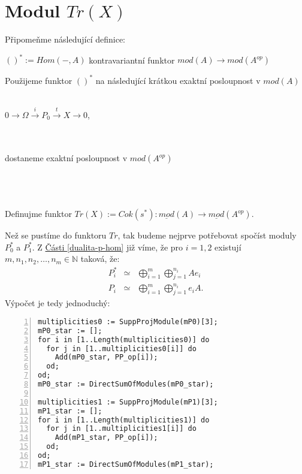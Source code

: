     
    
    
  \section{Modul $Tr(X)$}
  
      Připomeňme následující definice:
      \begin{description}
        \item[(a)] $()^*:=Hom(-,A)$ kontravariantní funktor $mod(A)\rightarrow mod(A^{op})$
        \item[(b)]
          Použijeme funktor $()^*$ na následující krátkou exaktní posloupnost v $mod(A)$ \\\\
          \centerline{$0\rightarrow\Omega\xrightarrow{i} P_{0}\xrightarrow{t}X\rightarrow0$,\\}  \\\\     
          dostaneme exaktní posloupnost v $mod(A^{op})$\\\\
          \centerline{ } \\\\     
          Definujme funktor $Tr(X):=Cok(s^*):\underline{mod}(A)\rightarrow \underline{mod}(A^{op})$.
          \item
      \end{description}

    Než se pustíme do funktoru $Tr$, tak
       budeme nejprve potřebovat spočíst moduly $P_0^*$ a $P_1^*$. 
      Z \hyperref[dualita-p-hom]{Části \ref*{dualita-p-hom}}  již víme, že pro $i=1,2$ existují 
      $m,n_1, n_2, \ldots, n_m \in \mathbb N$ taková, že: 
          \begin{eqnarray} 
             P_i^* &\simeq&  \bigoplus_{i=1}^m\bigoplus_{j=1}^{n_i}Ae_i \nonumber 
             \\
             P_i &\simeq&  \bigoplus_{i=1}^m\bigoplus_{j=1}^{n_i}e_iA. \nonumber 
         \end{eqnarray}
       Výpočet je tedy jednoduchý:
      \begin{Verbatim}[frame=single,numbers=left]
multiplicities0 := SuppProjModule(mP0)[3];
mP0_star := [];
for i in [1..Length(multiplicities0)] do
  for j in [1..multiplicities0[i]] do
    Add(mP0_star, PP_op[i]);
  od;
od;
mP0_star := DirectSumOfModules(mP0_star);

multiplicities1 := SuppProjModule(mP1)[3];
mP1_star := [];
for i in [1..Length(multiplicities1)] do
  for j in [1..multiplicities1[i]] do
    Add(mP1_star, PP_op[i]);
  od;
od;
mP1_star := DirectSumOfModules(mP1_star);        
      \end{Verbatim}     
      
